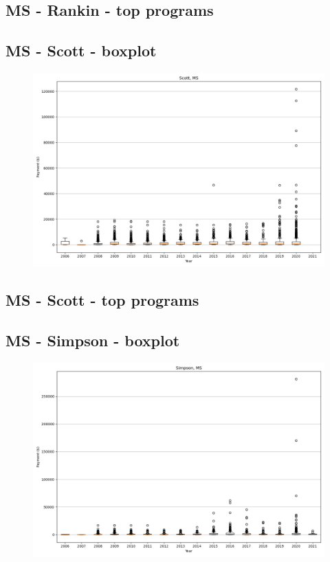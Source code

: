 \subsection*{MS - Rankin - top programs}

\newpage
\subsection*{MS - Scott - boxplot}
\begin{figure}[h]
\centering
\includegraphics[width=7in]{../output/boxplots/counties/Scott-MS_boxplot.png}
\end{figure}


\subsection*{MS - Scott - top programs}

\newpage
\subsection*{MS - Simpson - boxplot}
\begin{figure}[h]
\centering
\includegraphics[width=7in]{../output/boxplots/counties/Simpson-MS_boxplot.png}
\end{figure}


